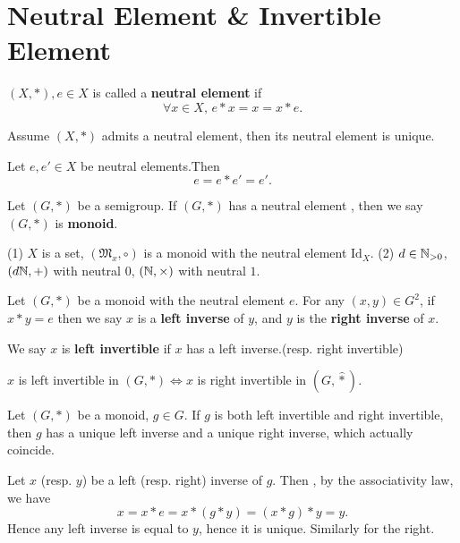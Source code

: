 \section{Neutral Element \& Invertible Element}
\begin{definitionenv}
    $(X, *), e\in X$ is called a \textbf{neutral element} if 
    $$\forall x\in X, \,  e*x=x=x*e.$$
\end{definitionenv}
\begin{propositionenv}
    Assume $(X, *)$ admits a neutral element,  then its neutral element is unique.
\end{propositionenv}
\begin{proofenv}
    Let $e, e'\in X$ be neutral elements.Then 
    $$e=e*e'=e'.$$
\end{proofenv}
\begin{definitionenv}
    Let $(G, *)$ be a semigroup. If $(G, *)$ has a neutral element ,  then we say $(G, *)$ is \textbf{monoid}.
\end{definitionenv}
\begin{exampleenv}
    \quad
    \newline
    (1) $X$ is a set,  $(\mathfrak{M} _x, \circ)$ is a monoid with the neutral element $\mathrm{Id}_X$.
    \newline
    (2) $d\in \mathbb{N}_{>0}$, $(d\mathbb{N}, +)$ with neutral $0$, $(\mathbb{N}, \times)$ with neutral $1$.
\end{exampleenv}
\begin{definitionenv}
    Let $(G, *)$ be a monoid with the neutral element $e$. For any $ (x, y)\in G^2$,  if $x*y=e$ then we say $x$ is a \textbf{left inverse} of $y$,  and $y$ is the \textbf{right inverse} of $x$.
\end{definitionenv}
\begin{remark}
    We say $x$ is \textbf{left invertible} if $x$ has a left inverse.(resp. right invertible)
\end{remark}
\begin{remark}
    $x$ is left invertible in $(G, *)\Leftrightarrow x $ is right invertible in $(G, \hat{*})$.
\end{remark}
\begin{propositionenv}
    Let $(G, *)$ be a monoid,  $g\in G$. If $g$ is both left invertible and right invertible,  then $g$ has a unique left inverse and a unique right inverse, which actually coincide.
\end{propositionenv}
\begin{proofenv}
    Let $x$ (resp. $y$) be a left (resp. right) inverse of $g$. Then ,  by the associativity law,  we have 
    $$x=x*e=x*(g*y)=(x*g)*y=y.$$
    Hence any left inverse is equal to $y$,  hence it is unique. Similarly for the right.
\end{proofenv}

